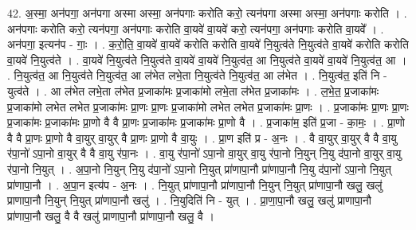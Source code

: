\documentclass[17pt]{extarticle}
\begin{document}
42. अ॒स्मा॒ अन॑पगा॒ अन॑पगा अस्मा अस्मा॒ अन॑पगाः करोति करो॒ त्यन॑पगा अस्मा अस्मा॒ अन॑पगाः करोति । . अन॑पगाः करोति करो॒ त्यन॑पगा॒ अन॑पगाः करोति वा॒यवे॑ वा॒यवे॑ करो॒ त्यन॑पगा॒ अन॑पगाः करोति वा॒यवे᳚ । . अन॑पगा॒ इत्यन॑प - गाः॒ । . क॒रो॒ति॒ वा॒यवे॑ वा॒यवे॑ करोति करोति वा॒यवे॑ नि॒युत्व॑ते नि॒युत्व॑ते वा॒यवे॑ करोति करोति वा॒यवे॑ नि॒युत्व॑ते । . वा॒यवे॑ नि॒युत्व॑ते नि॒युत्व॑ते वा॒यवे॑ वा॒यवे॑ नि॒युत्व॑त॒ आ नि॒युत्व॑ते वा॒यवे॑ वा॒यवे॑ नि॒युत्व॑त॒ आ । . नि॒युत्व॑त॒ आ नि॒युत्व॑ते नि॒युत्व॑त॒ आ ल॑भेत लभे॒ता नि॒युत्व॑ते नि॒युत्व॑त॒ आ ल॑भेत । . नि॒युत्व॑त॒ इति॑ नि - युत्व॑ते । . आ ल॑भेत लभे॒ता ल॑भेत प्र॒जाका॑मः प्र॒जाका॑मो लभे॒ता ल॑भेत प्र॒जाका॑मः । . ल॒भे॒त॒ प्र॒जाका॑मः प्र॒जाका॑मो लभेत लभेत प्र॒जाका॑मः प्रा॒णः प्रा॒णः प्र॒जाका॑मो लभेत लभेत प्र॒जाका॑मः प्रा॒णः । . प्र॒जाका॑मः प्रा॒णः प्रा॒णः प्र॒जाका॑मः प्र॒जाका॑मः प्रा॒णो वै वै प्रा॒णः प्र॒जाका॑मः प्र॒जाका॑मः प्रा॒णो वै । . प्र॒जाका॑म॒ इति॑ प्र॒जा - का॒मः॒ । . प्रा॒णो वै वै प्रा॒णः प्रा॒णो वै वा॒युर् वा॒युर् वै प्रा॒णः प्रा॒णो वै वा॒युः । . प्रा॒ण इति॑ प्र - अ॒नः । . वै वा॒युर् वा॒युर् वै वै वा॒यु र॑पा॒नो॑ ऽपा॒नो वा॒युर् वै वै वा॒यु र॑पा॒नः । . वा॒यु र॑पा॒नो॑ ऽपा॒नो वा॒युर् वा॒यु र॑पा॒नो नि॒युन् नि॒यु द॑पा॒नो वा॒युर् वा॒यु र॑पा॒नो नि॒युत् । . अ॒पा॒नो नि॒युन् नि॒यु द॑पा॒नो॑ ऽपा॒नो नि॒युत् प्रा॑णापा॒नौ प्रा॑णापा॒नौ नि॒यु द॑पा॒नो॑ ऽपा॒नो नि॒युत् प्रा॑णापा॒नौ । . अ॒पा॒न इत्य॑प - अ॒नः । . नि॒युत् प्रा॑णापा॒नौ प्रा॑णापा॒नौ नि॒युन् नि॒युत् प्रा॑णापा॒नौ खलु॒ खलु॑ प्राणापा॒नौ नि॒युन् नि॒युत् प्रा॑णापा॒नौ खलु॑ । . नि॒युदिति॑ नि - युत् । . प्रा॒णा॒पा॒नौ खलु॒ खलु॑ प्राणापा॒नौ प्रा॑णापा॒नौ खलु॒ वै वै खलु॑ प्राणापा॒नौ प्रा॑णापा॒नौ खलु॒ वै । \newline
\end{document}
